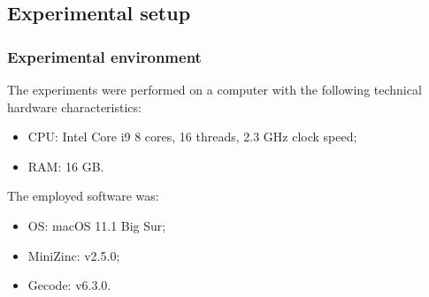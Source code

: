 \documentclass[../main.tex]{subfiles}
\begin{document}
\subsection{Experimental setup}
\label{subsec:experimental-setup}
\subsubsection{Experimental environment}
\label{subsubsec:experimental-environment}
The experiments were performed on a computer with the following technical hardware characteristics:
\begin{itemize}
    \item CPU: Intel Core i9 8 cores, 16 threads, 2.3 GHz clock speed;
    \item RAM: 16 GB.
\end{itemize}
The employed software was:
\begin{itemize}
    \item OS: macOS 11.1 Big Sur;
    \item MiniZinc: v2.5.0;
    \item Gecode: v6.3.0.
\end{itemize}
\end{document}
